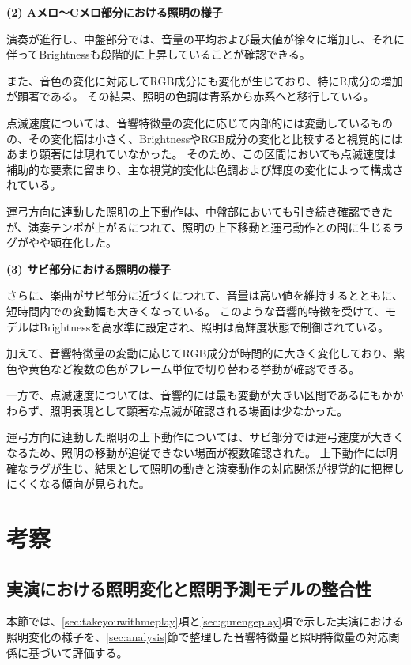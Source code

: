 \noindent \textbf{(2) Aメロ～Cメロ部分における照明の様子}

演奏が進行し、中盤部分では、音量の平均および最大値が徐々に増加し、それに伴ってBrightnessも段階的に上昇していることが確認できる。

また、音色の変化に対応してRGB成分にも変化が生じており、特にR成分の増加が顕著である。
その結果、照明の色調は青系から赤系へと移行している。

点滅速度については、音響特徴量の変化に応じて内部的には変動しているものの、その変化幅は小さく、BrightnessやRGB成分の変化と比較すると視覚的にはあまり顕著には現れていなかった。
そのため、この区間においても点滅速度は補助的な要素に留まり、主な視覚的変化は色調および輝度の変化によって構成されている。

運弓方向に連動した照明の上下動作は、中盤部においても引き続き確認できたが、演奏テンポが上がるにつれて、照明の上下移動と運弓動作との間に生じるラグがやや顕在化した。

\noindent \textbf{(3) サビ部分における照明の様子}

さらに、楽曲がサビ部分に近づくにつれて、音量は高い値を維持するとともに、短時間内での変動幅も大きくなっている。
このような音響的特徴を受けて、モデルはBrightnessを高水準に設定され、照明は高輝度状態で制御されている。

加えて、音響特徴量の変動に応じてRGB成分が時間的に大きく変化しており、紫色や黄色など複数の色がフレーム単位で切り替わる挙動が確認できる。

一方で、点滅速度については、音響的には最も変動が大きい区間であるにもかかわらず、照明表現として顕著な点滅が確認される場面は少なかった。

運弓方向に連動した照明の上下動作については、サビ部分では運弓速度が大きくなるため、照明の移動が追従できない場面が複数確認された。
上下動作には明確なラグが生じ、結果として照明の動きと演奏動作の対応関係が視覚的に把握しにくくなる傾向が見られた。


\section{考察} \label{sec:think}

\subsection{実演における照明変化と照明予測モデルの整合性}

本節では、\ref{sec:takeyouwithmeplay}項と\ref{sec:gurengeplay}項で示した実演における照明変化の様子を、\ref{sec:analysis}節で整理した音響特徴量と照明特徴量の対応関係に基づいて評価する。

